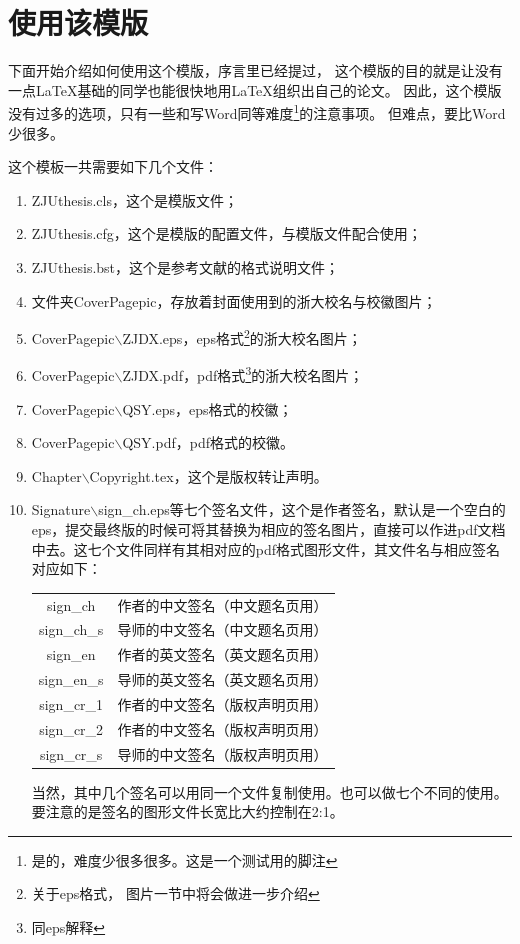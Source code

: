 \chapter{使用该模版}

下面开始介绍如何使用这个模版，序言里已经提过，
这个模版的目的就是让没有一点\LaTeX 基础的同学也能很快地用\LaTeX 组织出自己的论文。
因此，这个模版没有过多的选项，只有一些和写Word同等难度\footnote{是的，难度少很多很多。这是一个测试用的脚注}的注意事项。
但难点，要比Word少很多。

这个模板一共需要如下几个文件：
\begin{enumerate}
\item{ZJUthesis.cls}，这个是模版文件；
\item{ZJUthesis.cfg}，这个是模版的配置文件，与模版文件配合使用；
\item{ZJUthesis.bst}，这个是参考文献的格式说明文件；
\item{文件夹CoverPagepic}，存放着封面使用到的浙大校名与校徽图片；
\item{CoverPagepic$\backslash$ZJDX.eps}，eps格式\footnote{关于eps格式，
图片一节中将会做进一步介绍}的浙大校名图片；
\item{CoverPagepic$\backslash$ZJDX.pdf}，pdf格式\footnote{同eps解释}的浙大校名图片；
\item{CoverPagepic$\backslash$QSY.eps}，eps格式的校徽；
\item{CoverPagepic$\backslash$QSY.pdf}，pdf格式的校徽。
\item{Chapter$\backslash$Copyright.tex}，这个是版权转让声明。
\item{Signature$\backslash$sign\_ch.eps等七个签名文件}，这个是作者签名，默认是一个空白的eps，提交最终版的时候可将其替换为相应的签名图片，直接可以作进pdf文档中去。这七个文件同样有其相对应的pdf格式图形文件，其文件名与相应签名对应如下：

{
\begin{tabular}{cl}
sign\_ch & 作者的中文签名（中文题名页用）\\
sign\_ch\_s & 导师的中文签名（中文题名页用）\\
sign\_en & 作者的英文签名（英文题名页用）\\
sign\_en\_s & 导师的英文签名（英文题名页用）\\
sign\_cr\_1 & 作者的中文签名（版权声明页用）\\
sign\_cr\_2 & 作者的中文签名（版权声明页用）\\
sign\_cr\_s & 导师的中文签名（版权声明页用）\\
\end{tabular}
}

当然，其中几个签名可以用同一个文件复制使用。也可以做七个不同的使用。
要注意的是签名的图形文件长宽比大约控制在2:1。
\end{enumerate}

